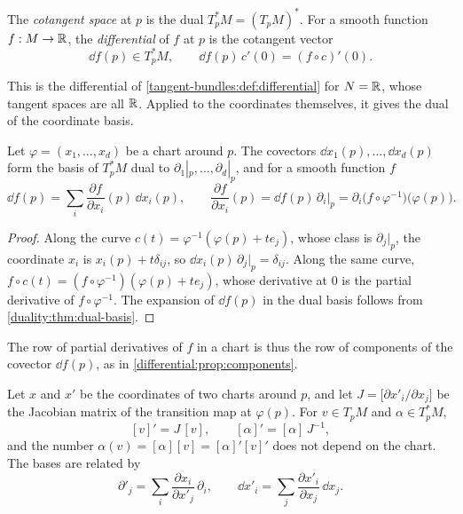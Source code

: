 \begin{notechapter}
\begin{definition}
\label{tangent-bundles:def:cotangent}
The \emph{cotangent space} at $p$ is the dual $T_p^*M = (T_pM)^*$. For a
smooth function $f:M\to\mathbb{R}$, the \emph{differential} of $f$ at $p$ is the
cotangent vector
\[
  \dd f(p)\in T_p^*M , \qquad \dd f(p)\,c'(0) = (f\circ c)'(0) .
\]
\end{definition}

This is the differential of \cref{tangent-bundles:def:differential} for
$N = \mathbb{R}$, whose tangent spaces are all $\mathbb{R}$. Applied to the coordinates
themselves, it gives the dual of the coordinate basis.

\begin{proposition}
\label{tangent-bundles:prop:components}
Let $\varphi = (x_1,\dots,x_d)$ be a chart around $p$. The covectors
$\dd x_1(p),\dots,\dd x_d(p)$ form the basis of $T_p^*M$ dual to
$\partial_1|_p,\dots,\partial_d|_p$, and for a smooth function $f$
\[
  \dd f(p) = \sum_i\frac{\partial f}{\partial x_i}(p)\,\dd x_i(p) ,
  \qquad
  \frac{\partial f}{\partial x_i}(p)
  = \dd f(p)\,\partial_i|_p
  = \partial_i\bigl(f\circ\varphi^{-1}\bigr)\bigl(\varphi(p)\bigr) .
\]
\end{proposition}

\begin{proof}
Along the curve $c(t) = \varphi^{-1}(\varphi(p) + te_j)$, whose class is
$\partial_j|_p$, the coordinate $x_i$ is $x_i(p) + t\delta_{ij}$, so
$\dd x_i(p)\,\partial_j|_p = \delta_{ij}$. Along the same curve,
$f\circ c(t) = (f\circ\varphi^{-1})(\varphi(p) + te_j)$, whose derivative
at $0$ is the partial derivative of $f\circ\varphi^{-1}$. The expansion
of $\dd f(p)$ in the dual basis follows from
\cref{duality:thm:dual-basis}.
\end{proof}

The row of partial derivatives of $f$ in a chart is thus the row of
components of the covector $\dd f(p)$, as in
\cref{differential:prop:components}.

\begin{theorem}\label{tangent-bundles:thm:change}
Let $x$ and $x'$ be the coordinates of two charts around $p$, and let
$J = \bigl[\partial x'_i/\partial x_j\bigr]$ be the Jacobian matrix of
the transition map at $\varphi(p)$. For $v\in T_pM$ and
$\alpha\in T_p^*M$,
\[
  [v]' = J\,[v] , \qquad [\alpha]' = [\alpha]\,J^{-1} ,
\]
and the number $\alpha(v) = [\alpha][v] = [\alpha]'[v]'$ does not depend
on the chart. The bases are related by
\[
  \partial'_j = \sum_i\frac{\partial x_i}{\partial x'_j}\,\partial_i ,
  \qquad
  \dd x'_i = \sum_j\frac{\partial x'_i}{\partial x_j}\,\dd x_j .
\]
\end{theorem}


\end{notechapter}
